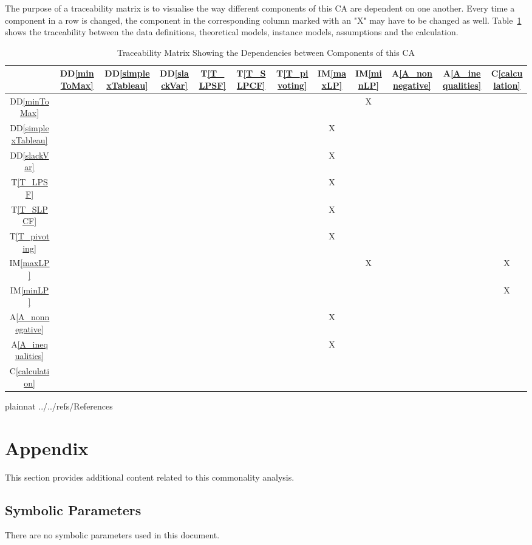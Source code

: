 \documentclass[12pt]{article}
\newcommand{\ddref}[1]{DD\ref{#1}}
\newcommand{\tref}[1]{T\ref{#1}}
\newcommand{\aref}[1]{A\ref{#1}}
\newcommand{\calcref}[1]{C\ref{#1}}
\newcommand{\iref}[1]{IM\ref{#1}}
\begin{document}
The purpose of a traceability matrix is to visualise the way different 
components of this CA are dependent on one another. Every time a component in a 
row is changed, the component in the corresponding column marked with an "X" 
may have to be changed as well.  Table~\ref{Table_traceability1} shows the 
traceability between the data definitions, theoretical models, instance models, 
assumptions and the calculation.

\begin{table}[h!]
	\centering
	\begin{tabular}{|c|c|c|c|c|c|c|c|c|c|c|c|}
		\hline        
		& \ddref{minToMax} & \ddref{simplexTableau} & \ddref{slackVar} & 
		\tref{T_LPSF} & \tref{T_SLPCF} & \tref{T_pivoting} & \iref{maxLP} & 
		\iref{minLP} & \aref{A_nonnegative} & \aref{A_inequalities} & 
		\calcref{calculation} \\
		\hline
		\ddref{minToMax} 	    &   &   &   &   &   &   &   & X &   &   &  \\
		\hline
		\ddref{simplexTableau}  &   &   &   &   &   &   & X &   &   &   &  \\ 
		\hline
		\ddref{slackVar} 		&   &   &   &   &   &   & X &   &   &   &  \\ 
		\hline
		\tref{T_LPSF} 		  	&   &   &   &   &   &   & X &   &   &   &  \\ 
		\hline
		\tref{T_SLPCF} 	  		&   &   &   &   &   &   & X &   &   &   &  \\ 
		\hline  
		\tref{T_pivoting} 		&   &   &   &   &   &   & X &   &   &   &  \\ 
		\hline
		\iref{maxLP} 	  		&   &   &   &   &   &   &   & X &   &   & X\\ 
		\hline
		\iref{minLP}   			&   &   &   &   &   &   &   &   &   &   & X\\ 
		\hline
		\aref{A_nonnegative}	&   &   &   &   &   &   & X &   &   &   &  \\
		\hline 
		\aref{A_inequalities} 	&   &   &   &   &   &   & X &   &   &   &  \\
		\hline
		\calcref{calculation} 	&   &   &   &   &   &   &   &   &   &   & \\
		\hline
	\end{tabular}
	\caption{Traceability Matrix Showing the Dependencies between Components of 
	this CA}
	\label{Table_traceability1}
\end{table}

\newpage

 {plainnat}
 {../../refs/References}

\newpage

\section{Appendix}

	This section provides additional content related to this commonality 
	analysis.

\subsection{Symbolic Parameters}

There are no symbolic parameters used in this document.
\end{document}
